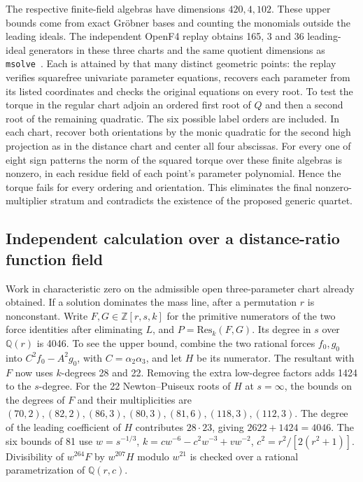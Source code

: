 \documentclass[11pt]{article}
\newcommand{\Q}{\mathbb Q}
\begin{document}
The respective finite-field algebras have dimensions $420,4,102$. These upper bounds come from exact Gr\"obner bases and counting the monomials outside the leading ideals. The independent OpenF4 replay obtains 165, 3 and 36 leading-ideal generators in these three charts and the same quotient dimensions as \texttt{msolve}~\cite{msolve}. Each is attained by that many distinct geometric points: the replay verifies squarefree univariate parameter equations, recovers each parameter from its listed coordinates and checks the original equations on every root. To test the torque in the regular chart adjoin an ordered first root of $Q$ and then a second root of the remaining quadratic. The six possible label orders are included. In each chart, recover both orientations by the monic quadratic for the second high projection as in the distance chart and center all four abscissas. For every one of eight sign patterns the norm of the squared torque over these finite algebras is nonzero, in each residue field of each point's parameter polynomial. Hence the torque fails for every ordering and orientation. This eliminates the final nonzero-multiplier stratum and contradicts the existence of the proposed generic quartet.

\subsection{Independent calculation over a distance-ratio function field}
Work in characteristic zero on the admissible open three-parameter chart already obtained. If a solution dominates the mass line, after a permutation $r$ is nonconstant. Write $F,G\in\mathbb Z[r,s,k]$ for the primitive numerators of the two force identities after eliminating $L$, and $P=\mathrm{Res}_k(F,G)$. Its degree in $s$ over $\Q(r)$ is 4046. To see the upper bound, combine the two rational forces $f_0,g_0$ into $C^2f_0-A^2 g_0$, with $C=\alpha_2\alpha_3$, and let $H$ be its numerator. The resultant with $F$ now uses $k$-degrees 28 and 22. Removing the extra low-degree factors adds 1424 to the $s$-degree. For the 22 Newton--Puiseux roots of $H$ at $s=\infty$, the bounds on the degrees of $F$ and their multiplicities are $(70,2),(82,2),(86,3),(80,3),(81,6),(118,3),(112,3)$. The degree of the leading coefficient of $H$ contributes $28\cdot23$, giving $2622+1424=4046$. The six bounds of 81 use $w=s^{-1/3}$, $k=c w^{-6}-c^2 w^{-3}+v w^{-2}$, $c^2=r^2/[2(r^2+1)]$. Divisibility of $w^{264}F$ by $w^{207}H$ modulo $w^{21}$ is checked over a rational parametrization of $\Q(r,c)$.
\end{document}
